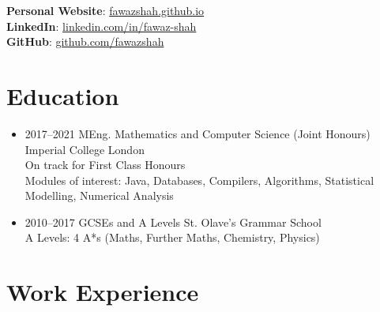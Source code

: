 \documentclass[11pt,a4paper,sans]{moderncv}        %
\begin{document}
\maketitle

\vspace{-35pt}

\begin{center}
\textbf{Personal Website}: \href{https://fawazshah.github.io/}{fawazshah.github.io} \\
\textbf{LinkedIn}: \href{https://www.linkedin.com/in/fawaz-shah/}{linkedin.com/in/fawaz-shah} \\
\textbf{GitHub}: \href{https://github.com/fawazshah/}{github.com/fawazshah}
\end{center}

\section{Education}

\vspace{5pt}

\begin{itemize}

\item{
\cventry
{2017--2021}
{MEng. Mathematics and Computer Science (Joint Honours)}
{Imperial College London}
{}{}{
\noindent
\\
On track for First Class Honours
\\
Modules of interest: Java, Databases, Compilers, Algorithms, Statistical Modelling, Numerical Analysis
}
} %

\item{
\cventry
{2010--2017}
{GCSEs and A Levels}
{St. Olave's Grammar School}
{}{}{
\noindent
\\
A Levels: 4 A*s (Maths, Further Maths, Chemistry, Physics)
}}

\end{itemize}

\section{Work Experience}
\end{document}
